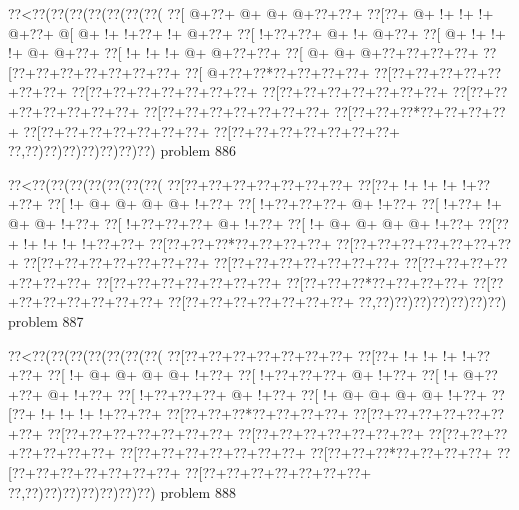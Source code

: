 \vbox{\vbox{\goo
\0??<\0??(\0??(\0??(\0??(\0??(\0??(\0??(
\0??[\- @+\0??+\- @+\- @+\- @+\0??+\0??+
\0??[\0??+\- @+\- !+\- !+\- !+\- @+\0??+
\- @[\- @+\- !+\- !+\0??+\- !+\- @+\0??+
\0??[\- !+\0??+\0??+\- @+\- !+\- @+\0??+
\0??[\- @+\- !+\- !+\- !+\- @+\- @+\0??+
\0??[\- !+\- !+\- !+\- @+\- @+\0??+\0??+
\0??[\- @+\- @+\- @+\0??+\0??+\0??+\0??+
\0??[\0??+\0??+\0??+\0??+\0??+\0??+\0??+
\0??[\- @+\0??+\0??*\0??+\0??+\0??+\0??+
\0??[\0??+\0??+\0??+\0??+\0??+\0??+\0??+
\0??[\0??+\0??+\0??+\0??+\0??+\0??+\0??+
\0??[\0??+\0??+\0??+\0??+\0??+\0??+\0??+
\0??[\0??+\0??+\0??+\0??+\0??+\0??+\0??+
\0??[\0??+\0??+\0??+\0??+\0??+\0??+\0??+
\0??[\0??+\0??+\0??*\0??+\0??+\0??+\0??+
\0??[\0??+\0??+\0??+\0??+\0??+\0??+\0??+
\0??[\0??+\0??+\0??+\0??+\0??+\0??+\0??+
\0??,\0??)\0??)\0??)\0??)\0??)\0??)\0??)
}
\hfil problem 886\hfil\break
}

\vbox{\vbox{\goo
\0??<\0??(\0??(\0??(\0??(\0??(\0??(\0??(
\0??[\0??+\0??+\0??+\0??+\0??+\0??+\0??+
\0??[\0??+\- !+\- !+\- !+\- !+\0??+\0??+
\0??[\- !+\- @+\- @+\- @+\- @+\- !+\0??+
\0??[\- !+\0??+\0??+\0??+\- @+\- !+\0??+
\0??[\- !+\0??+\- !+\- @+\- @+\- !+\0??+
\0??[\- !+\0??+\0??+\0??+\- @+\- !+\0??+
\0??[\- !+\- @+\- @+\- @+\- @+\- !+\0??+
\0??[\0??+\- !+\- !+\- !+\- !+\0??+\0??+
\0??[\0??+\0??+\0??*\0??+\0??+\0??+\0??+
\0??[\0??+\0??+\0??+\0??+\0??+\0??+\0??+
\0??[\0??+\0??+\0??+\0??+\0??+\0??+\0??+
\0??[\0??+\0??+\0??+\0??+\0??+\0??+\0??+
\0??[\0??+\0??+\0??+\0??+\0??+\0??+\0??+
\0??[\0??+\0??+\0??+\0??+\0??+\0??+\0??+
\0??[\0??+\0??+\0??*\0??+\0??+\0??+\0??+
\0??[\0??+\0??+\0??+\0??+\0??+\0??+\0??+
\0??[\0??+\0??+\0??+\0??+\0??+\0??+\0??+
\0??,\0??)\0??)\0??)\0??)\0??)\0??)\0??)
}
\hfil problem 887\hfil\break
}

\vbox{\vbox{\goo
\0??<\0??(\0??(\0??(\0??(\0??(\0??(\0??(
\0??[\0??+\0??+\0??+\0??+\0??+\0??+\0??+
\0??[\0??+\- !+\- !+\- !+\- !+\0??+\0??+
\0??[\- !+\- @+\- @+\- @+\- @+\- !+\0??+
\0??[\- !+\0??+\0??+\0??+\- @+\- !+\0??+
\0??[\- !+\- @+\0??+\0??+\- @+\- !+\0??+
\0??[\- !+\0??+\0??+\0??+\- @+\- !+\0??+
\0??[\- !+\- @+\- @+\- @+\- @+\- !+\0??+
\0??[\0??+\- !+\- !+\- !+\- !+\0??+\0??+
\0??[\0??+\0??+\0??*\0??+\0??+\0??+\0??+
\0??[\0??+\0??+\0??+\0??+\0??+\0??+\0??+
\0??[\0??+\0??+\0??+\0??+\0??+\0??+\0??+
\0??[\0??+\0??+\0??+\0??+\0??+\0??+\0??+
\0??[\0??+\0??+\0??+\0??+\0??+\0??+\0??+
\0??[\0??+\0??+\0??+\0??+\0??+\0??+\0??+
\0??[\0??+\0??+\0??*\0??+\0??+\0??+\0??+
\0??[\0??+\0??+\0??+\0??+\0??+\0??+\0??+
\0??[\0??+\0??+\0??+\0??+\0??+\0??+\0??+
\0??,\0??)\0??)\0??)\0??)\0??)\0??)\0??)
}
\hfil problem 888\hfil\break
}

